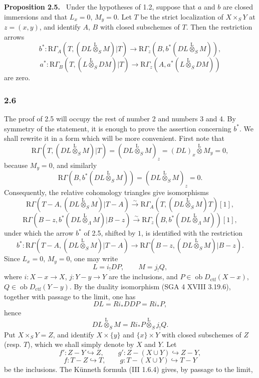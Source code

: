 \documentclass[11pt]{article}
\newenvironment{statement}[1]{\par\medskip\noindent\textbf{#1.}\ }{\par\medskip}
\providecommand{\lten}{\overset{\mathrm L}{\otimes}}
\providecommand{\Ob}{\operatorname{ob}}
\providecommand{\lten}{\overset{\mathrm L}{\otimes}}
\providecommand{\lten}{\overset{\mathrm L}{\otimes}}
\providecommand{\Ob}{\operatorname{ob}}
\providecommand{\lten}{\overset{\mathrm L}{\otimes}}
\providecommand{\lten}{\overset{\mathrm L}{\otimes}}
\providecommand{\Ob}{\operatorname{Ob}}
\providecommand{\lten}{\overset{\mathrm L}{\otimes}}
\providecommand{\Ob}{\operatorname{ob}}
\providecommand{\Ob}{\operatorname{Ob}}
\providecommand{\lten}{\overset{\mathrm L}{\otimes}}
\begin{document}
\begin{statement}{Proposition 2.5}
Under the hypotheses of 1.2, suppose that $a$ and $b$ are closed immersions and that $L_x=0$, $M_y=0$. Let $T$ be the strict localization of $X\times_SY$ at $z=(x,y)$, and identify $A$, $B$ with closed subschemes of $T$. Then the restriction arrows
\[
b^*:\mathrm R\Gamma_A(T,(DL\lten_SM)|T)
 \longrightarrow \mathrm R\Gamma_z(B,b^*(DL\lten_SM)),
\]
\[
a^*:\mathrm R\Gamma_B(T,(L\lten_SDM)|T)
 \longrightarrow \mathrm R\Gamma_z(A,a^*(L\lten_SDM))
\]
are zero.
\end{statement}

\subsubsection*{2.6}
The proof of 2.5 will occupy the rest of number 2 and numbers 3 and 4. By symmetry of the statement, it is enough to prove the assertion concerning $b^*$. We shall rewrite it in a form which will be more convenient. First note that
\[
\mathrm R\Gamma(T,(DL\lten_SM)|T)
 =(DL\lten_SM)_z
 =(DL)_x\lten M_y=0,
\]
because $M_y=0$, and similarly
\[
\mathrm R\Gamma(B,b^*(DL\lten_SM))
 =(DL\lten_SM)_z=0.
\]
Consequently, the relative cohomology triangles give isomorphisms
\[
\mathrm R\Gamma(T-A,(DL\lten_SM)|T-A)
 \xrightarrow{\sim}
\mathrm R\Gamma_A(T,(DL\lten_SM)T)[1],
\]
\[
\mathrm R\Gamma(B-z,b^*(DL\lten_{\Lambda}M)|B-z)
 \xrightarrow{\sim}
\mathrm R\Gamma_z(B,b^*(DL\lten_{\Lambda}M))[1],
\]
under which the arrow $b^*$ of 2.5, shifted by $1$, is identified with the restriction
\begin{equation}
b^*:\mathrm R\Gamma(T-A,(DL\lten_SM)|T-A)
 \longrightarrow \mathrm R\Gamma(B-z,(DL\lten_SM)|B-z).
\tag{2.6.1}
\end{equation}
Since $L_x=0$, $M_y=0$, one may write
\begin{equation}
L=i_!DP,\qquad M=j_!Q,
\tag{2.6.2}
\end{equation}
where $i:X-x\to X$, $j:Y-y\to Y$ are the inclusions, and $P\in\Ob D_{\mathrm{ctf}}(X-x)$, $Q\in\Ob D_{\mathrm{ctf}}(Y-y)$. By the duality isomorphism (SGA 4 XVIII 3.19.6), together with passage to the limit, one has
\[
DL=Ri_*DDP=Ri_*P,
\]
hence
\[
DL\lten_SM=Ri_*P\lten_Sj_!Q.
\]
Put $X\times_SY=Z$, and identify $X\times\{y\}$ and $\{x\}\times Y$ with closed subschemes of $Z$ (resp. $T$), which we shall simply denote by $X$ and $Y$. Let
\[
f':Z-Y\hookrightarrow Z,\qquad
g':Z-(X\cup Y)\hookrightarrow Z-Y,
\]
\[
f:T-Z\hookrightarrow T,\qquad
g:T-(X\cup Y)\hookrightarrow T-Y
\]
be the inclusions. The Künneth formula (III 1.6.4) gives, by passage to the limit,
\end{document}
